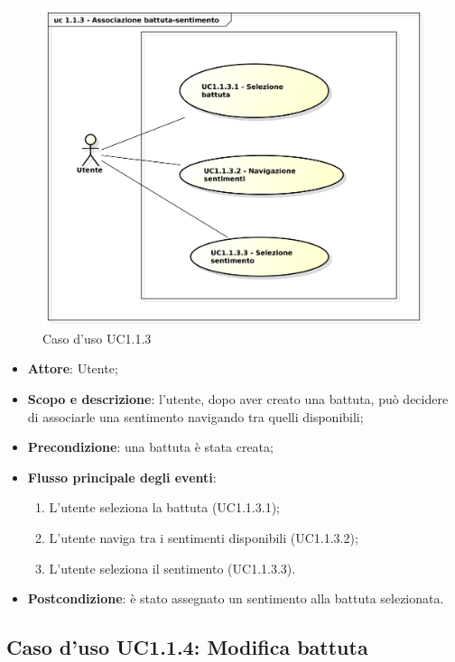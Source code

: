 \begin{figure}[htbp]
\centering
\includegraphics[scale=0.5]{UseCase_17_03_2016/immagini/uc_1_1_3_associazione_battuta_sentimento.png}
\captionsetup{labelfont=bf}
\caption{Caso d'uso UC1.1.3}
\end{figure}

\begin{itemize}
\item \textbf{Attore}: Utente;
\item \textbf{Scopo e descrizione}: l'utente, dopo aver creato una battuta, può decidere di associarle una sentimento navigando tra quelli disponibili;
\item \textbf{Precondizione}: una battuta è stata creata;
\item \textbf{Flusso principale degli eventi}:
\begin{enumerate}
\item L'utente seleziona la battuta (UC1.1.3.1);
\item L'utente naviga tra i sentimenti disponibili (UC1.1.3.2);
\item L'utente seleziona il sentimento (UC1.1.3.3).
\end{enumerate}
\item \textbf{Postcondizione}: è stato assegnato un sentimento alla battuta selezionata.
\end{itemize}

\subsection{Caso d'uso UC1.1.4: Modifica battuta}

